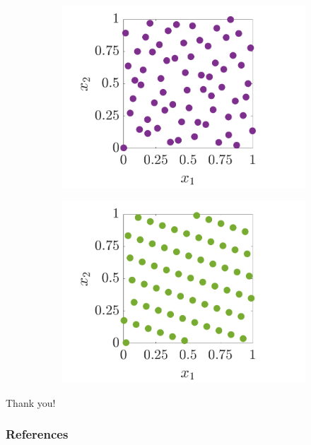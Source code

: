 \documentclass[handout, 10pt,compress,xcolor={usenames,dvipsnames}]{beamer} %
\begin{document}
{\begin{figure}[htp]
\begin{subfigure}[b]{0.35\textwidth}
    \end{subfigure}
    \centering
    \begin{subfigure}[b]{0.35\textwidth}
    \includegraphics[width=\textwidth]{figures/SSobolPoints}
    \end{subfigure}
    \centering
    \begin{subfigure}[b]{0.35\textwidth}
    \includegraphics[width=\textwidth]{figures/ShiftedLatticePoints}
    \end{subfigure}
\end{figure}
}
\fi


\begin{frame}[plain,c]

\begin{center}
\Huge Thank you!
\end{center}

\end{frame}


\begin{frame}[allowframebreaks]
	\frametitle{References}
	{}
\end{frame}
\end{document}
